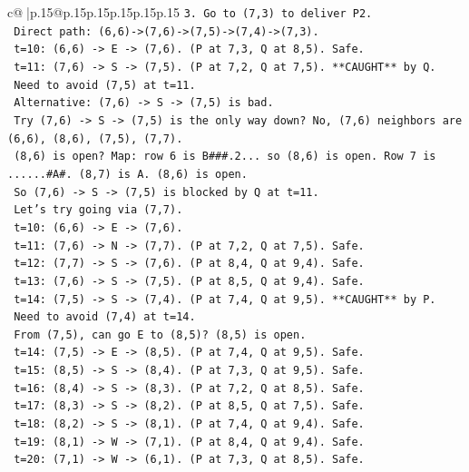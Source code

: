 \documentclass{article}
\begin{document}
{\begin{supertabular}{c@{$\;$}|p{.15\linewidth}@{}p{.15\linewidth}p{.15\linewidth}p{.15\linewidth}p{.15\linewidth}p{.15\linewidth}}
{{{\texttt{3. Go to (7,3) to deliver P2.} \\
\texttt{   Direct path: (6,6){-}>(7,6){-}>(7,5){-}>(7,4){-}>(7,3).} \\
\texttt{   t=10: (6,6) {-}> E {-}> (7,6). (P at 7,3, Q at 8,5). Safe.} \\
\texttt{   t=11: (7,6) {-}> S {-}> (7,5). (P at 7,2, Q at 7,5). **CAUGHT** by Q.} \\
\texttt{   Need to avoid (7,5) at t=11.} \\
\texttt{   Alternative: (7,6) {-}> S {-}> (7,5) is bad.} \\
\texttt{   Try (7,6) {-}> S {-}> (7,5) is the only way down? No, (7,6) neighbors are (6,6), (8,6), (7,5), (7,7).} \\
\texttt{   (8,6) is open? Map: row 6 is B\#\#\#.2... so (8,6) is open. Row 7 is ......\#A\#. (8,7) is A. (8,6) is open.} \\
\texttt{   So (7,6) {-}> S {-}> (7,5) is blocked by Q at t=11.} \\
\texttt{   Let's try going via (7,7).} \\
\texttt{   t=10: (6,6) {-}> E {-}> (7,6).} \\
\texttt{   t=11: (7,6) {-}> N {-}> (7,7). (P at 7,2, Q at 7,5). Safe.} \\
\texttt{   t=12: (7,7) {-}> S {-}> (7,6). (P at 8,4, Q at 9,4). Safe.} \\
\texttt{   t=13: (7,6) {-}> S {-}> (7,5). (P at 8,5, Q at 9,4). Safe.} \\
\texttt{   t=14: (7,5) {-}> S {-}> (7,4). (P at 7,4, Q at 9,5). **CAUGHT** by P.} \\
\texttt{   Need to avoid (7,4) at t=14.} \\
\texttt{   From (7,5), can go E to (8,5)? (8,5) is open.} \\
\texttt{   t=14: (7,5) {-}> E {-}> (8,5). (P at 7,4, Q at 9,5). Safe.} \\
\texttt{   t=15: (8,5) {-}> S {-}> (8,4). (P at 7,3, Q at 9,5). Safe.} \\
\texttt{   t=16: (8,4) {-}> S {-}> (8,3). (P at 7,2, Q at 8,5). Safe.} \\
\texttt{   t=17: (8,3) {-}> S {-}> (8,2). (P at 8,5, Q at 7,5). Safe.} \\
\texttt{   t=18: (8,2) {-}> S {-}> (8,1). (P at 7,4, Q at 9,4). Safe.} \\
\texttt{   t=19: (8,1) {-}> W {-}> (7,1). (P at 8,4, Q at 9,4). Safe.} \\
\texttt{   t=20: (7,1) {-}> W {-}> (6,1). (P at 7,3, Q at 8,5). Safe.} \\
}}}
\end{supertabular}}
\end{document}
